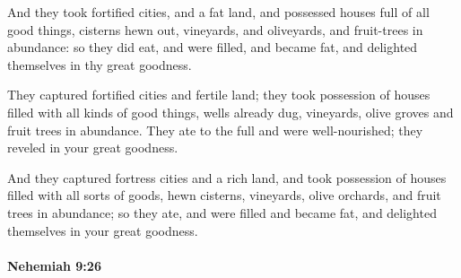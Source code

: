 			\begin{versebox}
					\item[BHS] 
					\item[LXX] 
					\item[ASV] And they took fortified cities, and a fat land, and possessed houses full of all good things, cisterns hewn out, vineyards, and oliveyards, and fruit-trees in abundance: so they did eat, and were filled, and became fat, and delighted themselves in thy great goodness.
					\item[NIV] They captured fortified cities and fertile land; they took possession of houses filled with all kinds of good things, wells already dug, vineyards, olive groves and fruit trees in abundance. They ate to the full and were well-nourished; they reveled in your great goodness.
					\item[NRSV] And they captured fortress cities and a rich land, and took possession of houses filled with all sorts of goods, hewn cisterns, vineyards, olive orchards, and fruit trees in abundance; so they ate, and were filled and became fat, and delighted themselves in your great goodness.
			\end{versebox}

		\paragraph{Nehemiah 9:26} %
			\label{NEHEMIAH-9-26}

